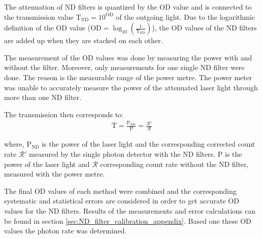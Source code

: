 The attenuation of ND filters is quantized by the OD value and is connected to the transmission value $ \text{T}_{\text{ND}} = 10^{\text{OD}}$ of the outgoing light.
Due to the logarithmic definition of the OD value ($\text{OD} = \log_{10}(\frac{1}{\text{T}_{\text{ND}}})$), the OD values of the
ND filters are added up when they are stacked on each other.

The measurement of the OD values was done by measuring the power with and without the filter.
Moreover, only measurements for one single ND filter were done.
The reason is the measurable range of the power metre.
The power meter was unable to accurately measure the power of the attenuated laser light through more than one ND filter.

The transmission then corresponds to:
\begin{align}
    \text{T} = \frac{\text{P}_{\text{ND}}}{\text{P}} = \frac{\mathcal{R}'}{\mathcal{R}}
\end{align}

where, $\text{P}_{\text{ND}}$ is the power of the laser light and the corresponding corrected count rate $\mathcal{R}'$ measured by the
single photon detector with the ND filters.
$\text{P}$ is the power of the laser light and $\mathcal{R}$ corresponding count rate
without the ND filter, measured with the power metre.

The final OD values of each method were combined and the corresponding systematic and statistical errors are
considered in order to get accurate OD values for the ND filters.
Results of the measurements and error calculations can be found in section \ref{sec:ND_filter_calibration_appendix}.
Based one these OD values the photon rate was determined.







%

\FloatBarrier


